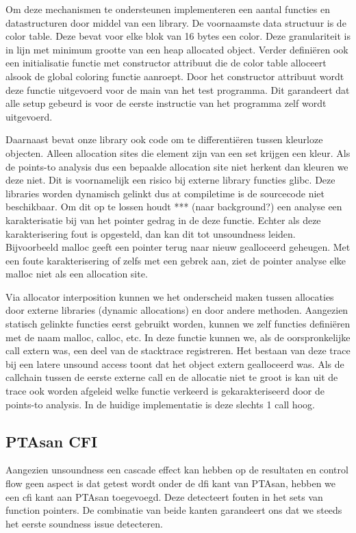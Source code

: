 \documentclass[conference]{IEEEtran}
\begin{document}
Om deze mechanismen te ondersteunen implementeren een aantal functies en datastructuren door middel van een library. De voornaamste data structuur is de color table. Deze bevat voor elke blok van 16 bytes een color. Deze granulariteit is in lijn met minimum grootte van een heap allocated object. Verder definiëren ook een initialisatie functie met constructor attribuut die de color table alloceert alsook de global coloring functie aanroept. Door het constructor attribuut wordt deze functie uitgevoerd voor de main van het test programma. Dit garandeert dat alle setup gebeurd is voor de eerste instructie van het programma zelf wordt uitgevoerd.

Daarnaast bevat onze library ook code om te differentiëren tussen kleurloze objecten. Alleen allocation sites die element zijn van een set krijgen een kleur. Als de points-to analysis dus een bepaalde allocation site niet herkent dan kleuren we deze niet. Dit is voornamelijk een risico bij externe library functies glibc. Deze libraries worden dynamisch gelinkt dus at compiletime is de sourcecode niet beschikbaar. Om dit op te lossen houdt *** (naar background?) een analyse een karakterisatie bij van het pointer gedrag in de deze functie. Echter als deze karakterisering fout is opgesteld, dan kan dit tot unsoundness leiden. Bijvoorbeeld malloc geeft een pointer terug naar nieuw gealloceerd geheugen. Met een foute karakterisering of zelfs met een gebrek aan, ziet de pointer analyse elke malloc niet als een allocation site. 

Via allocator interposition kunnen we het onderscheid maken tussen allocaties door externe libraries (dynamic allocations) en door andere methoden. Aangezien statisch gelinkte functies eerst gebruikt worden, kunnen we zelf functies definiëren met de naam malloc, calloc, etc. In deze functie kunnen we, als de oorspronkelijke call extern was, een deel van de stacktrace registreren. Het bestaan van deze trace bij een latere unsound access toont dat het object extern gealloceerd was. Als de callchain tussen de eerste externe call en de allocatie niet te groot is kan uit de trace ook worden afgeleid welke functie verkeerd is gekarakteriseerd door de points-to analysis. In de huidige implementatie is deze slechts 1 call hoog.

\subsection{PTAsan CFI}
Aangezien unsoundness een cascade effect kan hebben op de resultaten en control flow geen aspect is dat getest wordt onder de \gls{dfi} kant van PTAsan, hebben we een \gls{cfi} kant aan PTAsan toegevoegd. Deze detecteert fouten in het sets van function pointers. De combinatie van beide kanten garandeert ons dat we steeds het eerste soundness issue detecteren.
\end{document}
